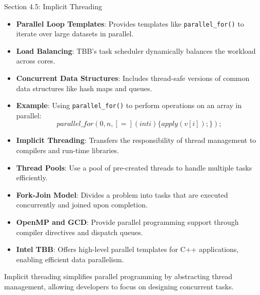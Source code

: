 \begin{notes}{Section 4.5: Implicit Threading}
    \begin{highlight}
    
        \begin{itemize}
            \item \textbf{Parallel Loop Templates}: Provides templates like \texttt{parallel\_for()} to iterate over large datasets in parallel.
            \item \textbf{Load Balancing}: TBB’s task scheduler dynamically balances the workload across cores.
            \item \textbf{Concurrent Data Structures}: Includes thread-safe versions of common data structures like hash maps and queues.
            \item \textbf{Example}: Using \texttt{parallel\_for()} to perform operations on an array in parallel:
    \[
    parallel\_for(0, n, [=](int i) \{ apply(v[i]); \});
    \]
        \end{itemize}
    
    \end{highlight}
    
    \begin{highlight}
    
        \begin{itemize}
            \item \textbf{Implicit Threading}: Transfers the responsibility of thread management to compilers and run-time libraries.
            \item \textbf{Thread Pools}: Use a pool of pre-created threads to handle multiple tasks efficiently.
            \item \textbf{Fork-Join Model}: Divides a problem into tasks that are executed concurrently and joined upon completion.
            \item \textbf{OpenMP and GCD}: Provide parallel programming support through compiler directives and dispatch queues.
            \item \textbf{Intel TBB}: Offers high-level parallel templates for C++ applications, enabling efficient data parallelism.
        \end{itemize}
    
    Implicit threading simplifies parallel programming by abstracting thread management, allowing developers to focus on designing concurrent tasks.
    
    \end{highlight}
\end{notes}

